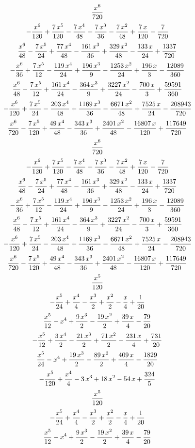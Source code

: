 $${{x^6}\over{720}}$$
$$-{{x^6}\over{120}}+{{7\,x^5}\over{120}}-{{7\,x^4}\over{48}}+{{7\,x^
 3}\over{36}}-{{7\,x^2}\over{48}}+{{7\,x}\over{120}}-{{7}\over{720}}$$
$${{x^6}\over{48}}-{{7\,x^5}\over{24}}+{{77\,x^4}\over{48}}-{{161\,x^
 3}\over{36}}+{{329\,x^2}\over{48}}-{{133\,x}\over{24}}+{{1337}\over{
 720}}$$
$$-{{x^6}\over{36}}+{{7\,x^5}\over{12}}-{{119\,x^4}\over{24}}+{{196\,
 x^3}\over{9}}-{{1253\,x^2}\over{24}}+{{196\,x}\over{3}}-{{12089
 }\over{360}}$$
$${{x^6}\over{48}}-{{7\,x^5}\over{12}}+{{161\,x^4}\over{24}}-{{364\,x
 ^3}\over{9}}+{{3227\,x^2}\over{24}}-{{700\,x}\over{3}}+{{59591
 }\over{360}}$$
$$-{{x^6}\over{120}}+{{7\,x^5}\over{24}}-{{203\,x^4}\over{48}}+{{1169
 \,x^3}\over{36}}-{{6671\,x^2}\over{48}}+{{7525\,x}\over{24}}-{{
 208943}\over{720}}$$
$${{x^6}\over{720}}-{{7\,x^5}\over{120}}+{{49\,x^4}\over{48}}-{{343\,
 x^3}\over{36}}+{{2401\,x^2}\over{48}}-{{16807\,x}\over{120}}+{{
 117649}\over{720}}$$
$${{x^6}\over{720}}$$
$$-{{x^6}\over{120}}+{{7\,x^5}\over{120}}-{{7\,x^4}\over{48}}+{{7\,x^
 3}\over{36}}-{{7\,x^2}\over{48}}+{{7\,x}\over{120}}-{{7}\over{720}}$$
$${{x^6}\over{48}}-{{7\,x^5}\over{24}}+{{77\,x^4}\over{48}}-{{161\,x^
 3}\over{36}}+{{329\,x^2}\over{48}}-{{133\,x}\over{24}}+{{1337}\over{
 720}}$$
$$-{{x^6}\over{36}}+{{7\,x^5}\over{12}}-{{119\,x^4}\over{24}}+{{196\,
 x^3}\over{9}}-{{1253\,x^2}\over{24}}+{{196\,x}\over{3}}-{{12089
 }\over{360}}$$
$${{x^6}\over{48}}-{{7\,x^5}\over{12}}+{{161\,x^4}\over{24}}-{{364\,x
 ^3}\over{9}}+{{3227\,x^2}\over{24}}-{{700\,x}\over{3}}+{{59591
 }\over{360}}$$
$$-{{x^6}\over{120}}+{{7\,x^5}\over{24}}-{{203\,x^4}\over{48}}+{{1169
 \,x^3}\over{36}}-{{6671\,x^2}\over{48}}+{{7525\,x}\over{24}}-{{
 208943}\over{720}}$$
$${{x^6}\over{720}}-{{7\,x^5}\over{120}}+{{49\,x^4}\over{48}}-{{343\,
 x^3}\over{36}}+{{2401\,x^2}\over{48}}-{{16807\,x}\over{120}}+{{
 117649}\over{720}}$$
$${{x^5}\over{120}}$$
$$-{{x^5}\over{24}}+{{x^4}\over{4}}-{{x^3}\over{2}}+{{x^2}\over{2}}-
 {{x}\over{4}}+{{1}\over{20}}$$
$${{x^5}\over{12}}-x^4+{{9\,x^3}\over{2}}-{{19\,x^2}\over{2}}+{{39\,x
 }\over{4}}-{{79}\over{20}}$$
$$-{{x^5}\over{12}}+{{3\,x^4}\over{2}}-{{21\,x^3}\over{2}}+{{71\,x^2
 }\over{2}}-{{231\,x}\over{4}}+{{731}\over{20}}$$
$${{x^5}\over{24}}-x^4+{{19\,x^3}\over{2}}-{{89\,x^2}\over{2}}+{{409
 \,x}\over{4}}-{{1829}\over{20}}$$
$$-{{x^5}\over{120}}+{{x^4}\over{4}}-3\,x^3+18\,x^2-54\,x+{{324
 }\over{5}}$$
$${{x^5}\over{120}}$$
$$-{{x^5}\over{24}}+{{x^4}\over{4}}-{{x^3}\over{2}}+{{x^2}\over{2}}-
 {{x}\over{4}}+{{1}\over{20}}$$
$${{x^5}\over{12}}-x^4+{{9\,x^3}\over{2}}-{{19\,x^2}\over{2}}+{{39\,x
 }\over{4}}-{{79}\over{20}}$$
